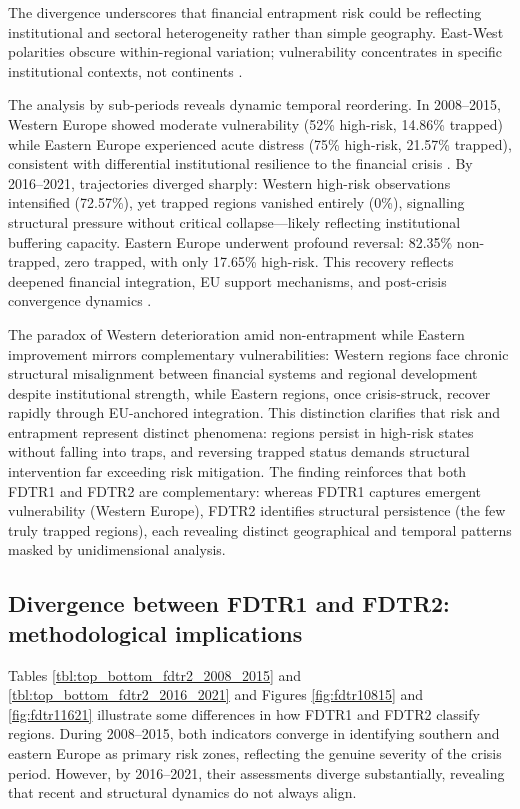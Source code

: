 \documentclass[a4paper,11pt,oneside]{article}
\begin{document}
The divergence underscores that financial entrapment risk could be reflecting institutional and sectoral heterogeneity rather than simple geography. East-West polarities obscure within-regional variation; vulnerability concentrates in specific institutional contexts, not continents \citep{stiglitz2009measurement, rodriguez2020institutions}.

The analysis by sub-periods reveals dynamic temporal reordering. In 2008--2015, Western Europe showed moderate vulnerability (52\% high-risk, 14.86\% trapped) while Eastern Europe experienced acute distress (75\% high-risk, 21.57\% trapped), consistent with differential institutional resilience to the financial crisis \citep{zuk2018real, gyHorffy2022middle}. By 2016--2021, trajectories diverged sharply: Western high-risk observations intensified (72.57\%), yet trapped regions vanished entirely (0\%), signalling structural pressure without critical collapse---likely reflecting institutional buffering capacity. Eastern Europe underwent profound reversal: 82.35\% non-trapped, zero trapped, with only 17.65\% high-risk. This recovery reflects deepened financial integration, EU support mechanisms, and post-crisis convergence dynamics \citep{alcidi2023eu}.


The paradox of Western deterioration amid non-entrapment while Eastern improvement mirrors complementary vulnerabilities: Western regions face chronic structural misalignment between financial systems and regional development despite institutional strength, while Eastern regions, once crisis-struck, recover rapidly through EU-anchored integration. This distinction clarifies that risk and entrapment represent distinct phenomena: regions persist in high-risk states without falling into traps, and reversing trapped status demands structural intervention far exceeding risk mitigation. The finding reinforces that both FDTR1 and FDTR2 are complementary: whereas FDTR1 captures emergent vulnerability (Western Europe), FDTR2 identifies structural persistence (the few truly trapped regions), each revealing distinct geographical and temporal patterns masked by unidimensional analysis.



\subsection{Divergence between FDTR1 and FDTR2: methodological implications}


Tables \ref{tbl:top_bottom_fdtr2_2008_2015} and \ref{tbl:top_bottom_fdtr2_2016_2021} and Figures \ref{fig:fdtr10815} and \ref{fig:fdtr11621} illustrate some differences in how FDTR1 and FDTR2 classify regions. During 2008--2015, both indicators converge in identifying southern and eastern Europe as primary risk zones, reflecting the genuine severity of the crisis period. However, by 2016--2021, their assessments diverge substantially, revealing that recent and structural dynamics do not always align.
\end{document}
